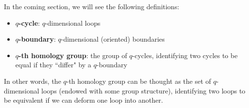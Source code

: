 In the coming section, we will see the following definitions:
\begin{itemize}
    \item \textbf{$q$-cycle}: $q$-dimensional loops
    \item \textbf{$q$-boundary}: $q$-dimensional (oriented) boundaries
    \item \textbf{$q$-th homology group}: the group of $q$-cycles, identifying two cycles to be equal if they ``differ" by a $q$-boundary
\end{itemize}
In other words, the $q$-th homology group can be thought as the set of $q$-dimensional loops (endowed with some group structure), identifying two loops to be equivalent if we can deform one loop into another.
